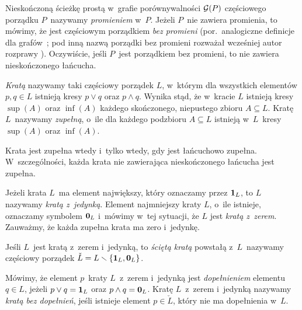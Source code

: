 Nieskończoną ścieżkę prostą w~grafie porównywalności $\mathcal{G}(P)$ częściowego porządku $P$~nazywamy \textit{promieniem} w~$P$. Jeżeli $P$~nie zawiera promienia, to mówimy, że jest częściowym porządkiem \textit{bez promieni} (por.~analogiczne definicje dla grafów~\cite{Schmidt83,Halin98}; pod inną nazwą porządki bez promieni rozważał wcześniej autor rozprawy \cite{Kukiela10,Kukiela10a}). Oczywiście, jeśli $P$~jest porządkiem bez promieni, to nie zawiera nieskończonego łańcucha.

\textit{Kratą} nazywamy taki częściowy porządek $L$, w~którym dla wszystkich elementów $p,q\in L$ istnieją kresy $p\lor q$ oraz $p\land q$. Wynika stąd, że w~kracie $L$ istnieją kresy $\sup(A)$ oraz $\inf(A)$ każdego skończonego, niepustego zbioru $A\subseteq L$. Kratę $L$~nazywamy \textit{zupełną}, o~ile dla każdego podzbioru $A\subseteq L$ istnieją w~$L$~kresy $\sup(A)$ oraz $\inf(A)$.

\begin{lem}\label{lem-krata_bez_nsk_lancuchow_jest_zupelna}
Krata jest zupełna wtedy i~tylko wtedy, gdy jest łańcuchowo zupełna. W~szczególności, każda krata nie zawierająca nieskończonego łańcucha jest zupełna.
\end{lem}

Jeżeli krata $L$~ma element największy, który oznaczamy przez $\mathbf{1}_L$, to $L$ nazywamy \textit{kratą z~jedynką}. Element najmniejszy kraty $L$, o~ile istnieje, oznaczamy symbolem $\mathbf{0}_L$ i~mówimy w~tej sytuacji, że $L$ jest \textit{kratą z~zerem}. Zauważmy, że każda zupełna krata ma zero i~jedynkę.

Jeśli $L$~jest kratą z~zerem i~jedynką, to \textit{ściętą kratą} powstałą z~$L$~nazywamy częściowy porządek $\check{L}=L\smallsetminus\{\mathbf{1}_L,\mathbf{0}_L\}$.

Mówimy, że element $p$~kraty $L$~z~zerem i~jedynką jest \textit{dopełnieniem} elementu $q\in L$, jeżeli $p\lor q=\mathbf{1}_L$ oraz $p\land q=\mathbf{0}_L$. Kratę $L$~z~zerem i~jedynką nazywamy \textit{kratą bez dopełnień}, jeśli istnieje element $p\in \check{L}$, który nie ma dopełnienia w~$L$. 

